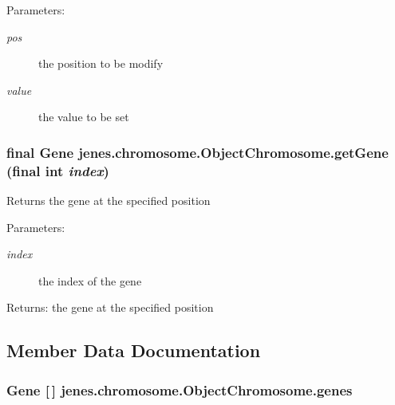\begin{Desc}
\item[Parameters:]
\begin{description}
\item[{\em pos}]the position to be modify \item[{\em value}]the value to be set \end{description}
\end{Desc}
\hypertarget{classjenes_1_1chromosome_1_1_object_chromosome_badaf50e19a5fd0ac5279de47914af99}{
\subsubsection[getGene]{\setlength{\rightskip}{0pt plus 5cm}final Gene jenes.chromosome.ObjectChromosome.getGene (final int {\em index})}}
\label{classjenes_1_1chromosome_1_1_object_chromosome_badaf50e19a5fd0ac5279de47914af99}


Returns the gene at the specified position 

\begin{Desc}
\item[Parameters:]
\begin{description}
\item[{\em index}]the index of the gene \end{description}
\end{Desc}
\begin{Desc}
\item[Returns:]the gene at the specified position \end{Desc}


\subsection{Member Data Documentation}
\hypertarget{classjenes_1_1chromosome_1_1_object_chromosome_33bb9e1cc526fe8e4be0417bbd05a127}{
\subsubsection[genes]{\setlength{\rightskip}{0pt plus 5cm}Gene \mbox{[}$\,$\mbox{]} {\bf jenes.chromosome.ObjectChromosome.genes}}}
\label{classjenes_1_1chromosome_1_1_object_chromosome_33bb9e1cc526fe8e4be0417bbd05a127}


